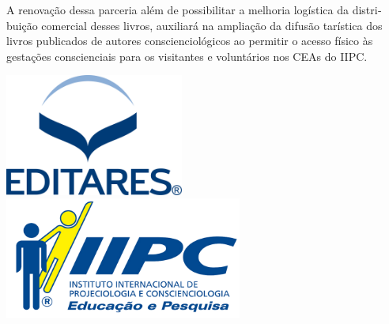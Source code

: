\documentclass{gescons}
\begin{document}
A renovação dessa parceria além de possibilitar a melhoria logística da distri­buição comercial desses livros, auxiliará na ampliação da difusão tarística dos livros pu­blicados de autores conscienciológicos ao permitir o acesso físico às gestações conscien­ciais para os visitantes e voluntários nos CEAs do IIPC.

\vspace{5mm}

\begin{center}
    \includegraphics[height=4cm]{images/Logo-Editares-com-Marca-Registrada.png}
    \hspace{3cm}
    \includegraphics[height=4cm]{images/IIPC_logo.png} 
\end{center}











\end{document}

